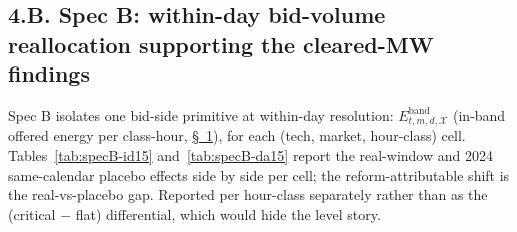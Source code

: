 \documentclass[11pt]{article}
\begin{document}
\vspace{10pt}

\subsection*{4.B. Spec B: within-day bid-volume reallocation supporting the cleared-MW findings}\label{sec:4-specB}
Spec B isolates one bid-side primitive at within-day resolution: $E^{\text{band}}_{t,m,d,\mathcal{X}}$ (in-band offered energy per class-hour, \hyperref[sec:setup]{\S~1}), for each (tech, market, hour-class) cell. Tables~\ref{tab:specB-id15} and~\ref{tab:specB-da15} report the real-window and 2024 same-calendar placebo effects side by side per cell; the reform-attributable shift is the real-vs-placebo gap. Reported per hour-class separately rather than as the (critical $-$ flat) differential, which would hide the level story.
\end{document}
